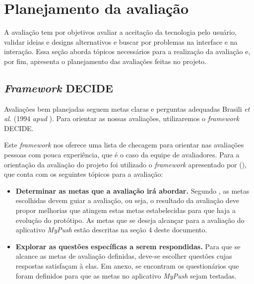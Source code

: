 \chapter{Planejamento da avaliação}

    A avaliação tem por objetivos avaliar a aceitação da tecnologia pelo usuário, validar ideias e designs alternativos e buscar 
    por problemas na interface e na interação. Essa seção aborda tópicos necessários para a realização da avaliação e, por fim, 
    apresenta o planejamento das avaliações feitas no projeto.
    
    \section{\textit{Framework} DECIDE}
    
    Avaliações bem planejadas seguem metas claras e perguntas adequadas Brasili \textit{et al.} (1994 \textit{apud} \cite{preece}).
    Para orientar as nossas avaliações, utilizaremos o \textit{framework} DECIDE.
    
    Este \textit{framework} nos oferece uma lista
    de checagem para orientar nas avaliações pessoas com pouca experiência, que é o caso da equipe de avaliadores. Para
    a orientação da avaliação do projeto foi utilizado o \textit{framework} apresentado por \citeauthor{preece} (\citeyear{preece}),
    que conta com os seguintes tópicos para a avaliação:
    
    \begin{itemize}
       \item \textbf{Determinar as metas que a avaliação irá abordar.}
       \subitem Segundo \cite{preece}, as metas escolhidas devem guiar a avaliação, ou seja, o resultado da avaliação deve propor melhorias 
       que atingem estas metas estabelecidas para que haja a evolução do protótipo. As metas que se deseja alcançar para a avaliação do 
       aplicativo \textit{MyPush} estão descritas na seção 4 deste documento.
    \end{itemize}
    
    \begin{itemize}
    
       \item \textbf{Explorar as questões específicas a serem respondidas.}
       \subitem Para que se alcance as metas de avaliação definidas, deve-se escolher questões cujas respostas satisfaçam à elas. 
        Em anexo, se encontram os questionários que foram definidos para que as metas no aplicativo \textit{MyPush} sejam testadas.
       
    \end{itemize}
    
